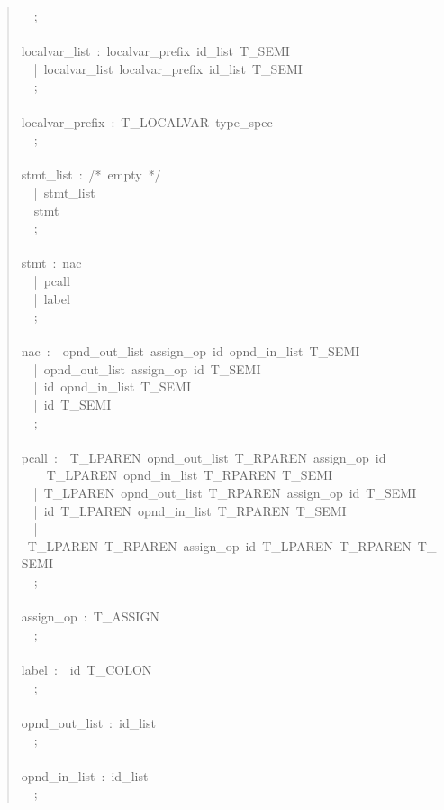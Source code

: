 \documentclass[a4paper]{article}
\begin{document}
\begin{quote}
{~~;\\
~\\
localvar\_list~:~localvar\_prefix~id\_list~T\_SEMI\\
~~|~localvar\_list~localvar\_prefix~id\_list~T\_SEMI\\
~~;\\
~\\
localvar\_prefix~:~T\_LOCALVAR~type\_spec\\
~~;\\
~\\
stmt\_list~:~/*~empty~*/\\
~~|~stmt\_list\\
~~stmt\\
~~;\\
~\\
stmt~:~nac\\
~~|~pcall\\
~~|~label\\
~~;\\
~\\
nac~:~~opnd\_out\_list~assign\_op~id~opnd\_in\_list~T\_SEMI\\
~~|~opnd\_out\_list~assign\_op~id~T\_SEMI\\
~~|~id~opnd\_in\_list~T\_SEMI\\
~~|~id~T\_SEMI\\
~~;\\
~\\
pcall~:~~T\_LPAREN~opnd\_out\_list~T\_RPAREN~assign\_op~id\\
~~~~T\_LPAREN~opnd\_in\_list~T\_RPAREN~T\_SEMI\\
~~|~T\_LPAREN~opnd\_out\_list~T\_RPAREN~assign\_op~id~T\_SEMI\\
~~|~id~T\_LPAREN~opnd\_in\_list~T\_RPAREN~T\_SEMI\\
~~|~T\_LPAREN~T\_RPAREN~assign\_op~id~T\_LPAREN~T\_RPAREN~T\_SEMI\\
~~;\\
~\\
assign\_op~:~T\_ASSIGN\\
~~;\\
~\\
label~:~~id~T\_COLON\\
~~;\\
~\\
opnd\_out\_list~:~id\_list\\
~~;\\
~\\
opnd\_in\_list~:~id\_list\\
~~;\\
}
\end{quote}
\end{document}
